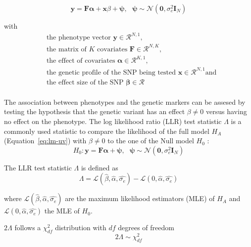\begin{equation}
\mathbf{y} = \mathbf{F}\boldsymbol{\alpha} + \mathbf{x}\beta + \boldsymbol{\psi},\text{ }
\boldsymbol{\psi}\sim\mathcal{N}\left(\mathbf{0},\sigma_e^2\mathbf{I}_N\right)
\label{eq:lm-uv}
\end{equation}

with
\begin{align*} 
& \text{the phenotype vector } \mathbf{y} \in \mathcal{R}^{N,1},\\
& \text{the matrix of $K$ covariates } \mathbf{F} \in \mathcal{R}^{N,K},\\
& \text{the effect of covariates } \boldsymbol{\alpha} \in \mathcal{R}^{K,1},\\
& \text{the genetic profile of the SNP being tested } \mathbf{x} \in \mathcal{R}^{N,1} \text{and}\\
& \text{the effect size of the SNP } \boldsymbol{\beta} \in \mathcal{R}\\
\end{align*} 


\noindent The association between phenotypes and the genetic markers can be assesed by testing the hypothesis that the genetic variant has an effect \(\beta \neq 0\) versus having no effect on the phenotype. The log likelihood ratio (LLR) test statistic \(\Lambda\) is a commonly used statistic to compare the likelihood of the full model \(H_A\) (Equation~\ref{eq:lm-uv}) with \(\beta \neq 0\) to the one of the Null model \(H_0\) :
\begin{equation}
H_0: \mathbf{y} = \mathbf{F}\boldsymbol{\alpha}  + \boldsymbol{\psi},\text{ }
\boldsymbol{\psi}\sim\mathcal{N}\left(\mathbf{0},\sigma_e^2\mathbf{I}_N\right)
\label{eq:lm_null}
\end{equation}

\noindent The LLR test statistic \(\Lambda\) is defined as
\begin{equation}
\Lambda  =  \mathcal{L} (\hat{\beta}, \hat{\alpha}, \hat{\sigma_{e}}) -  \mathcal{L} (0, \hat{\alpha}, \hat{\sigma_{e}})
\label{eq:llr}
\end{equation}

\noindent where \(\mathcal{L} (\hat{\beta}, \hat{\alpha}, \hat{\sigma_{e}})\) are the maximum likelihood estimators (MLE) of \(H_A\) and \(\mathcal{L} (0, \hat{\alpha}, \hat{\sigma_{e}})\) the MLE of \(H_0\). 

\noindent \(2\Lambda\) follows a \(\chi^2_{df}\) distribution with \(df\) degrees of freedom \citep{Wilks1938} 
\begin{equation}
2\Lambda \sim \chi^2_{df} 
\label{eq:lambda}
\end{equation}

